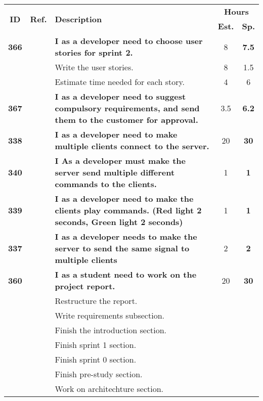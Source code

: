   \label{tab:sprint2stories}
 \def\arraystretch{1.25}
 
\begin{longtable}{ccXcc}
\toprule[1mm]
\multirow{2}{*}{\textbf{ID}} &
\multirow{2}{*}{\textbf{Ref.}} & \multirow{2}{*}{\textbf{Description}} & \multicolumn{2}{c}{\textbf{Hours}} \\
 				& & & \textbf{Est.} & \textbf{Sp.} \\ 				
\midrule

\textbf{366} 	& {M6}
	& {\bf I as a developer need to choose user stories for sprint 2.} 	& 	8	& \textbf{7.5} \\
				&& Write the user stories. 	& 8 &  1.5 \\
				&& Estimate time needed for each story. 	&  4 & 6 \\	

	
\textbf{367} 	& {M6}
	& {\bf I as a developer need to suggest compulsory requirements, and send them to the customer for approval.} 	& 		3.5	& \textbf{6.2} \\

\textbf{338} 	& {M6}
	& {\bf I as a developer need to make multiple clients connect to the server.} 	& 	20		& \textbf{30} \\


\textbf{340} 	& {M6}
	& {\bf I As a developer must make the server send multiple different commands to the clients. } 	& 		1	& \textbf{1} \\

\textbf{339} 	& {M3}
	& {\bf  I as a developer need to make the clients play commands. (Red light 2 seconds, Green light 2 seconds)} 	& 		1	& \textbf{1} \\

\textbf{337} 	& {M3}
	& {\bf  I as a developer needs to make the server to send the same signal to multiple clients} 	& 		2	& \textbf{2} \\
		
\midrule
\textbf{360} 	& {M6}
	& {\bf I as a student need to work on the project report.} 	& 	20	& \textbf{ 30} \\
				&& Restructure the report.	&  &  \\
				&& Write requirements subsection.	&  &  \\
				&& Finish the introduction section.	&  & \\
				&& Finish sprint 1 section.	&  &  \\
				&& Finish sprint 0 section.	&  &  \\
				&& Finish pre-study section.	&  &  \\
				&& Work on architechture section.	&  &  \\


\end{longtable}
